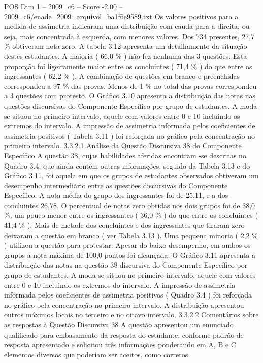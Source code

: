 \begin{textsample}{POS Dim 1 – 2009\_c6 – Score -2.00 – 2009\_c6/enade\_2009\_arquivol\_ba1f6e9589.txt}
Os valores positivos para a medida de assimetria indicaram uma distribuição com cauda para a direita, ou seja, mais concentrada à esquerda, com menores valores.
Dos 734 presentes, 27,7 \% obtiveram nota zero.
A tabela 3.12 apresenta um detalhamento da situação destes estudantes.
A maioria ( 66,0 \% ) não fez nenhuma das 3 questões.
Esta proporção foi ligeiramente maior entre os concluintes ( 71,4 \% ) do que entre os ingressantes ( 62,2 \% ).
A combinação de questões em branco e preenchidas correspondeu a 97 \% das provas.
Menos de 1 \% no total das provas correspondeu a 3 questões com protesto.
O Gráfico 3.10 apresenta a distribuição das notas nas questões discursivas do Componente Específico por grupo de estudantes.
A moda se situou no primeiro intervalo, aquele com valores entre 0 e 10 incluindo os extremos do intervalo.
A impressão de assimetria informada pelos coeficientes de assimetria positivos ( Tabela 3.11 ) foi reforçada no gráfico pela concentração no primeiro intervalo. 3.3.2.1 Análise da Questão Discursiva 38 do Componente Específico A questão 38, cujas habilidades aferidas encontram -se descritas no Quadro 3.4, que ainda contém outras informações, seguido da Tabela 3.13 e do Gráfico 3.11, foi aquela em que os grupos de estudantes observados obtiveram um desempenho intermediário entre as questões discursivas do Componente Específico.
A nota média do grupo dos ingressantes foi de 25,11, e a dos concluintes 26,78.
O percentual de notas zero obtidas nos dois grupos foi de 38,0 \%, um pouco menor entre os ingressantes ( 36,0 \% ) do que entre os concluintes ( 41,4 \% ).
Mais de metade dos concluintes e dos ingressantes que tiraram zero deixaram a questão em branco ( ver Tabela 3.13 ).
Uma pequena minoria ( 2,2 \% ) utilizou a questão para protestar.
Apesar do baixo desempenho, em ambos os grupos a nota máxima de 100,0 pontos foi alcançada.
O Gráfico 3.11 apresenta a distribuição das notas na questão 38 discursiva do Componente Específico por grupo de estudantes.
A moda se situou no primeiro intervalo, aquele com valores entre 0 e 10 incluindo os extremos do intervalo.
A impressão de assimetria informada pelos coeficientes de assimetria positivos ( Quadro 3.4 ) foi reforçada no gráfico pela concentração no primeiro intervalo.
A distribuição apresentou outros máximos locais no terceiro e no oitavo intervalo. 3.3.2.2 Comentários sobre as respostas à Questão Discursiva 38 A questão apresentou um enunciado qualificado para embasamento da resposta do estudante, conforme padrão de resposta apresentado e solicitou três informações ponderando em A, B e C elementos diversos que poderiam ser aceitos, como corretos.

\end{textsample}
